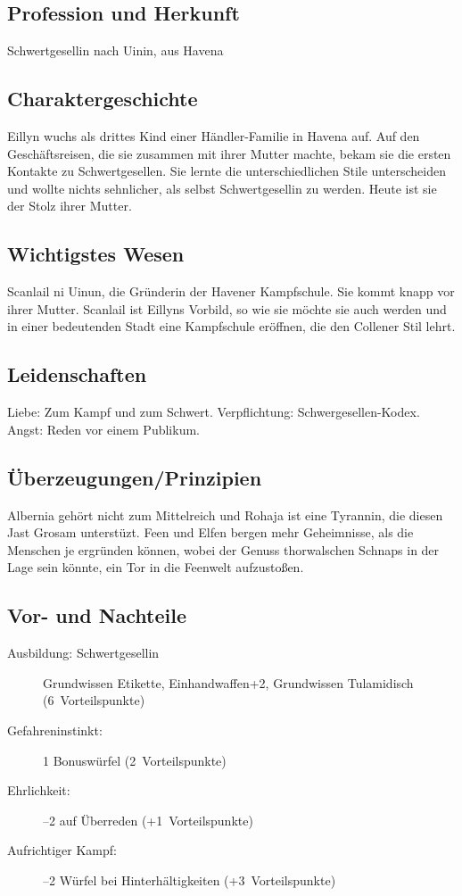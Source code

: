\subsection{Profession und Herkunft}
Schwertgesellin nach Uinin, aus Havena

\subsection{Charaktergeschichte}
Eillyn wuchs als drittes Kind einer Händler-Familie in Havena auf. Auf den Geschäftsreisen, die sie zusammen mit ihrer Mutter machte, bekam sie die ersten Kontakte zu Schwertgesellen. Sie lernte die unterschiedlichen Stile unterscheiden und wollte nichts sehnlicher, als selbst Schwertgesellin zu werden. Heute ist sie der Stolz ihrer Mutter.

\subsection{Wichtigstes Wesen}
Scanlail ni Uinun, die Gründerin der Havener Kampfschule. Sie kommt knapp vor ihrer Mutter. Scanlail ist Eillyns Vorbild, so wie sie möchte sie auch werden und in einer bedeutenden Stadt eine Kampfschule eröffnen, die den Collener Stil lehrt.

\subsection{Leidenschaften}
Liebe: Zum Kampf und zum Schwert. Verpflichtung: Schwergesellen-Kodex. Angst: Reden vor einem Publikum.

\subsection{Überzeugungen/Prinzipien}
Albernia gehört nicht zum Mittelreich und Rohaja ist eine Tyrannin, die diesen Jast Grosam unterstüzt. Feen und Elfen bergen mehr Geheimnisse, als die Menschen je ergründen können, wobei der Genuss thorwalschen Schnaps in der Lage sein könnte, ein Tor in die Feenwelt aufzustoßen.

\subsection{Vor- und Nachteile}
\begin{description}
\item[Ausbildung: Schwertgesellin] Grundwissen Etikette, Einhandwaffen+2, Grundwissen Tulamidisch (6~Vorteilspunkte)
\item[Gefahreninstinkt:] 1 Bonuswürfel (2~Vorteilspunkte)
\item[Ehrlichkeit:] --2 auf Überreden (+1~Vorteilspunkte)
\item[Aufrichtiger Kampf:] --2 Würfel bei Hinterhältigkeiten (+3~Vorteilspunkte)
\end{description}

